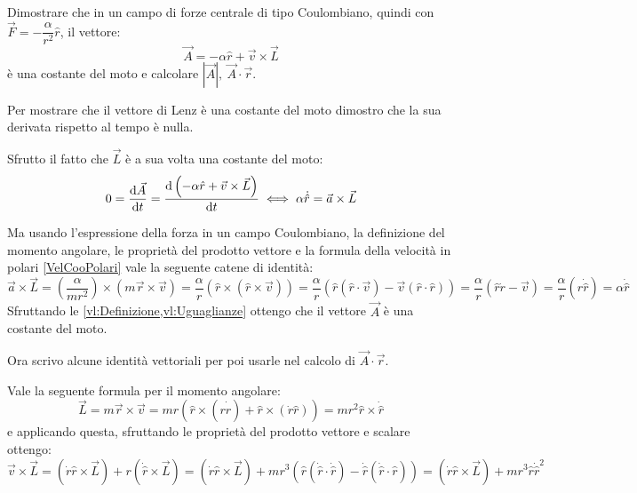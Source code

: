 \documentclass[../main.tex]{subfiles}
\begin{document}

\textex
Dimostrare che in un campo di forze centrale di tipo Coulombiano, quindi con $\vec{F}=-\dfrac{\alpha}{r^2}\hat r$, il vettore:
\begin{equation} \label{vl:Definizione}
	\vec{A}=-\alpha \hat r + \vec v\times \vec L
\end{equation}
è una costante del moto e calcolare $|\vec A|,\ \vec{A} \cdot \vec{r}$.


\solution
Per mostrare che il vettore di Lenz è una costante del moto dimostro che la sua derivata rispetto al tempo è nulla.

Sfrutto il fatto che $\vec L$ è a sua volta una costante del moto:
\begin{equation}\label{vl:Derivata}
	0=\frac{\mathrm{d} \vec A}{\mathrm{d} t}=\frac{\mathrm{d} \left(-\alpha\hat r + \vec v\times \vec L\right) }{\mathrm{d} t} \iff \alpha\dot{\hat r} = \vec a\times \vec L
\end{equation}

Ma usando l'espressione della forza in un campo Coulombiano, la definizione del momento angolare, le proprietà del prodotto vettore 
e la formula della velocità in polari \cref{VelCooPolari} vale la seguente catene di identità:
\begin{equation}\label{vl:Uguaglianze}
	\vec a\times \vec L=\left(\dfrac{\alpha}{mr^2}\right)\times\left(m\vec r\times \vec v\right)=\frac{\alpha}{r} \left(\hat r\times \left(\hat r\times \vec v\right)\right)
        =\frac{\alpha}{r} \left(\hat r\left(\hat r \cdot \vec v\right)-\vec v\left(\hat r\cdot \hat r\right)\right)
	=\frac{\alpha}{r} \left(\hat r\dot{r}-\vec v\right)=\frac{\alpha}{r}\left(r\dot{\hat r}\right)=\alpha \dot{\hat r}
\end{equation}
Sfruttando le \cref{vl:Definizione,vl:Uguaglianze} ottengo che il vettore $\vec A$ è una costante del moto.

Ora scrivo alcune identità vettoriali per poi usarle nel calcolo di $\vec A\cdot \vec r$.

Vale la seguente formula per il momento angolare:
\begin{equation*}
	\vec L=m\vec r\times \vec v=mr\left(\hat r\times (r\dot{ \hat r })+\hat r\times(\dot r \hat r)\right)
	= mr^2\hat r\times\dot{\hat r}
\end{equation*}
e applicando questa, sfruttando le proprietà del prodotto vettore e scalare ottengo:
\begin{equation}\label{vl:VperL}
	\vec v\times \vec L=(\dot r \hat r \times \vec L)+r\left(\dot{\hat r}\times \vec L\right)
	=(\dot r \hat r \times \vec L)+mr^3\left(\hat r(\dot{\hat r}\cdot \dot{\hat r})-\dot{\hat r}(\dot{\hat r}\cdot \hat r) \right)
	=(\dot r \hat r \times \vec L)+mr^3 \hat r \dot{\hat r}^2
\end{equation}
\end{document}

